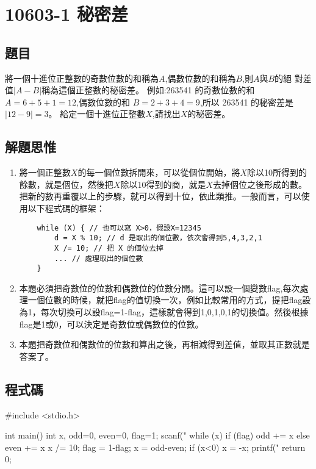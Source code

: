 \section{10603-1 秘密差}

\subsection{題目}
將一個十進位正整數的奇數位數的和稱為$A$,偶數位數的和稱為$B$,則$A$與$B$的絕
對差值$|A-B|$稱為這個正整數的秘密差。
例如:263541 的奇數位數的和 $A = 6+5+1 = 12$,偶數位數的和 $B = 2+3+4 = 9$,所以
263541 的秘密差是$|12-9|= 3$。
給定一個十進位正整數$X$,請找出$X$的秘密差。

\subsection{解題思惟}
\begin{enumerate}
	\item 將一個正整數$X$的每一個位數拆開來，可以從個位開始，將$X$除以10所得到的餘數，就是個位，然後把$X$除以10得到的商，就是$X$去掉個位之後形成的數。把新的數再重覆以上的步驟，就可以得到十位，依此類推。一般而言，可以使用以下程式碼的框架：
	\begin{verbatim}
	while (X) { // 也可以寫 X>0，假設X=12345
		d = X % 10; // d 是取出的個位數，依次會得到5,4,3,2,1
		X /= 10; // 把 X 的個位去掉
		... // 處理取出的個位數
	}
	\end{verbatim}
	\item 本題必須把奇數位的位數和偶數位的位數分開。這可以設一個變數flag,每次處理一個位數的時候，就把flag的值切換一次，例如比較常用的方式，提把flag設為1，每次切換可以設flag=1-flag，這樣就會得到1,0,1,0,1的切換值。然後根據flag是1或0，可以決定是奇數位或偶數位的位數。
	\item 本題把奇數位和偶數位的位數和算出之後，再相減得到差值，並取其正數就是答案了。
\end{enumerate}

\subsection{程式碼}
\begin{cppcode}
#include <stdio.h>

int main()
{
	int x, odd=0, even=0, flag=1;
	scanf("%
	while (x) {
		if (flag) odd += x%
		else even += x%
		x /= 10;
		flag = 1-flag;
	}
	x = odd-even;
	if (x<0) x = -x;
	printf("%
	return 0;
}
\end{cppcode}
